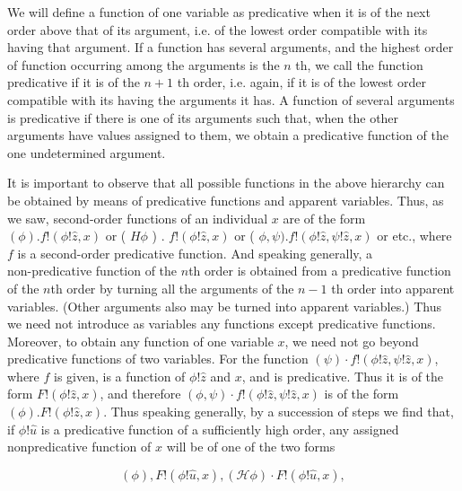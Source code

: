 \documentclass[10pt]{article}
\begin{document}
We will define a function of one variable as predicative when it is of the next order above that of its argument, i.e. of the lowest order compatible with its having that argument. If a function has several arguments, and the highest order of function occurring among the arguments is the $n$ th, we call the function predicative if it is of the $n+1$ th order, i.e. again, if it is of the lowest order compatible with its having the arguments it has. A function of several arguments is predicative if there is one of its arguments such that, when the other arguments have values assigned to them, we obtain a predicative function of the one undetermined argument.

It is important to observe that all possible functions in the above hierarchy can be obtained by means of predicative functions and apparent variables. Thus, as we saw, second-order functions of an individual $x$ are of the form\\
$(\phi) . f!(\phi!\hat{z}, x)$ or ( $H \phi$ ) . $f!(\phi!\hat{z}, x)$ or ( $\phi, \psi) . f!(\phi!\hat{z}, \psi!\hat{z}, x)$ or etc., where $f$ is a second-order predicative function. And speaking generally, a\\
non-predicative function of the $n$th order is obtained from a predicative function of the $n$th order by turning all the arguments of the $n-1$ th order into apparent variables. (Other arguments also may be turned into apparent variables.) Thus we need not introduce as variables any functions except predicative functions. Moreover, to obtain any function of one variable $x$, we need not go beyond predicative functions of two variables. For the function $(\psi) \cdot f!(\phi!\hat{z}, \psi!\hat{z}, x)$, where $f$ is given, is a function of $\phi!\hat{z}$ and $x$, and is predicative. Thus it is of the form $F!(\phi!\hat{z}, x)$, and therefore $(\phi, \psi) \cdot f!(\phi!\hat{z}, \psi!\hat{z}, x)$ is of the form $(\phi) . F!(\phi!\hat{z}, x)$. Thus speaking generally, by a succession of steps we find that, if $\phi!\hat{u}$ is a predicative function of a sufficiently high order, any assigned nonpredicative function of $x$ will be of one of the two forms

$$
(\phi), F!(\phi!\hat{u}, x),(\mathcal{H} \phi) \cdot F!(\phi!\hat{u}, x),
$$
\end{document}
